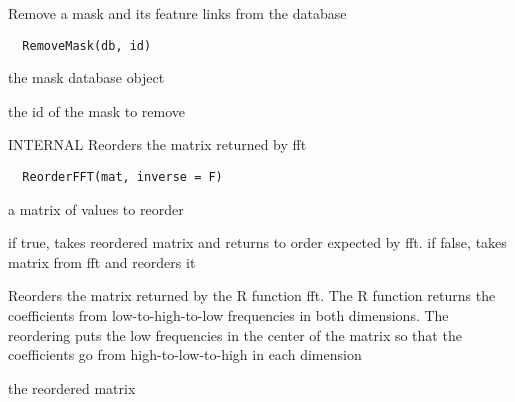\documentclass[a4paper]{book}
\begin{document}
%
\begin{Description}\relax
Remove a mask and its feature links from the database
\end{Description}
%
\begin{Usage}
\begin{verbatim}
  RemoveMask(db, id)
\end{verbatim}
\end{Usage}
%
\begin{Arguments}
\begin{ldescription}
\item[\code{db}] the mask database object

\item[\code{id}] the id of the mask to remove
\end{ldescription}
\end{Arguments}
%
\begin{Description}\relax
INTERNAL Reorders the matrix returned by fft
\end{Description}
%
\begin{Usage}
\begin{verbatim}
  ReorderFFT(mat, inverse = F)
\end{verbatim}
\end{Usage}
%
\begin{Arguments}
\begin{ldescription}
\item[\code{mat}] a matrix of values to reorder

\item[\code{inverse}] if true, takes reordered matrix and
returns to order expected by fft. if false, takes matrix
from fft and reorders it
\end{ldescription}
\end{Arguments}
%
\begin{Details}\relax
Reorders the matrix returned by the R function fft.  The
R function returns the coefficients from
low-to-high-to-low frequencies in both dimensions.  The
reordering puts the low frequencies in the center of the
matrix so that the coefficients go from
high-to-low-to-high in each dimension
\end{Details}
%
\begin{Value}
the reordered matrix
\end{Value}
\end{document}
